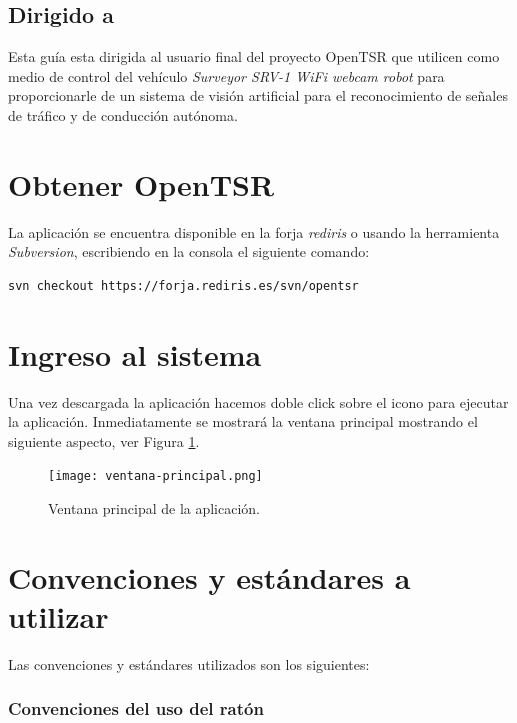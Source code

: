 \subsection{Dirigido a}

Esta guía esta dirigida al usuario final del proyecto OpenTSR que utilicen como medio de control del vehículo \emph{Surveyor SRV-1 WiFi webcam robot} para proporcionarle de un sistema de visión artificial para el reconocimiento de señales de tráfico y de conducción autónoma.

\section{Obtener OpenTSR}

La aplicación se encuentra disponible en la forja \emph{rediris}\cite{website:iris} o usando la herramienta \emph{Subversion}\cite{librosvn}, escribiendo en la consola el siguiente comando:\\

\begin{lstlisting}[style=consola]
svn checkout https://forja.rediris.es/svn/opentsr
\end{lstlisting}

\section{Ingreso al sistema}

Una vez descargada la aplicación hacemos doble click sobre el icono para ejecutar la aplicación. Inmediatamente se mostrará la ventana principal mostrando el siguiente aspecto, ver Figura \ref{fig:ventana-principal}.\\

\begin{figure}[H]
  \begin{center}
    \texttt{[image: ventana-principal.png]}
  \end{center}
  \caption{Ventana principal de la aplicación.}
  \label{fig:ventana-principal}
\end{figure}

\section{Convenciones y estándares a utilizar}
\label{subsec:convenciones}

Las convenciones y estándares utilizados son los siguientes:

\subsubsection{Convenciones del uso del ratón}


